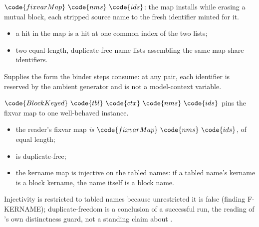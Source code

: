 \begin{definition}
\label{def:fixvarMap}
\leanok
{}
 $\code{fixvarMap}\ \code{nms}\ \code{ids}$: the map  installs while
erasing a mutual block, each stripped source name to the fresh identifier minted for it.
\begin{itemize}
\item a hit in the map is a hit at one common index of the two lists;
\item two equal-length, duplicate-free name lists assembling the same map share identifiers.
\end{itemize}
\end{definition}
\begin{remark}
 Supplies the form the binder steps consume: at any  pair, each identifier is
reserved by the ambient generator and is not a model-context variable.
\end{remark}
\begin{definition}
\label{def:BlockKeyed}
\leanok
{}
 $\code{BlockKeyed}\ \code{tbl}\ \code{ctx}\ \code{nms}\ \code{ids}$ pins the fixvar map
to one well-behaved instance.
\begin{itemize}
\item the reader's fixvar map \emph{is} $\code{fixvarMap}\ \code{nms}\ \code{ids}$, of equal length;
\item {} is duplicate-free;
\item the kername map is injective on the tabled names: if a tabled name's kername is a block kername,
the name itself is a block name.
\end{itemize}
\end{definition}
\begin{remark}
 Injectivity is restricted to tabled names because unrestricted it is false (finding
F-KERNAME); duplicate-freedom is a conclusion of a successful run, the reading of
's own distinctness guard, not a standing claim about
.
\end{remark}
